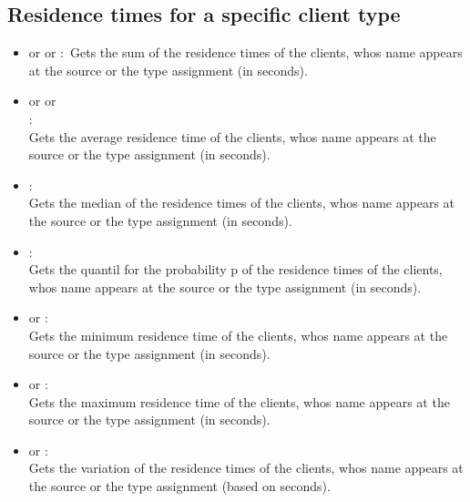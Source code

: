 \subsection{Residence times for a specific client type}

\begin{itemize}

\item
{} or  or :\
Gets the sum of the residence times of the clients, whos name appears at the source or the type assignment  (in seconds).

\item
{} or  or\\ :\\
Gets the average residence time of the clients, whos name appears at the source or the type assignment  (in seconds).

\item
{}:\\
Gets the median of the residence times of the clients, whos name appears at the source or the type assignment  (in seconds).

\item
{}:\\
Gets the quantil for the probability p of the residence times of the clients, whos name appears at the source or the type assignment  (in seconds).

\item
{} or :\\
Gets the minimum residence time of the clients, whos name appears at the source or the type assignment  (in seconds).

\item
{} or :\\
Gets the maximum residence time of the clients, whos name appears at the source or the type assignment  (in seconds).

\item
{} or :\\
Gets the variation of the residence times of the clients, whos name appears at the source or the type assignment  (based on seconds).


\end{itemize}
